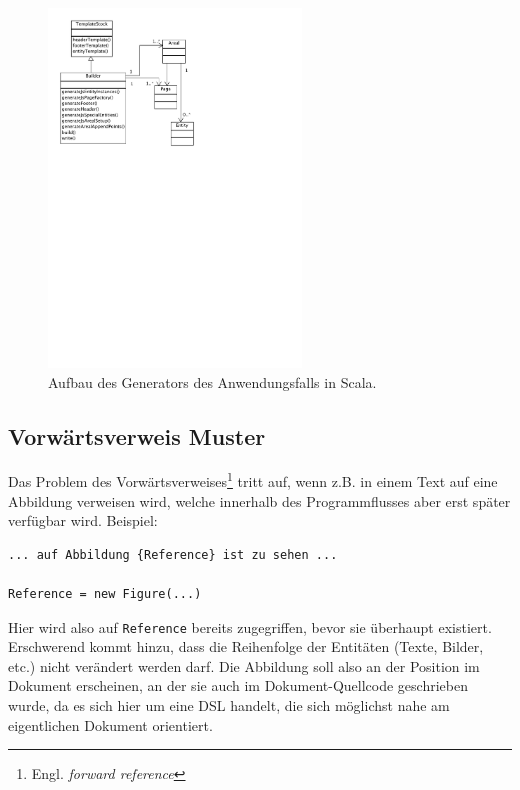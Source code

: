 \begin{figure}[h!]
  \centering
    \includegraphics[width=0.6\textwidth]{figures/uml_generator.pdf}
  \caption{Aufbau des Generators des Anwendungsfalls in Scala.}\label{fig-uml_generator}
\end{figure}


\subsection{Vorwärtsverweis Muster}\label{sec-forwardreference}

Das Problem des
Vorwärtsverweises\footnote{Engl. \emph{forward reference}} tritt auf,
wenn z.B. in einem Text auf eine Abbildung
verweisen wird, welche innerhalb des Programmflusses aber erst später verfügbar
wird. Beispiel:

\begin{lstlisting}
... auf Abbildung {Reference} ist zu sehen ...

Reference = new Figure(...)
\end{lstlisting}

Hier wird also auf \verb|Reference| bereits zugegriffen,
bevor sie überhaupt existiert. Erschwerend kommt hinzu, dass die
Reihenfolge der Entitäten (Texte, Bilder, etc.) nicht verändert werden darf.
Die Abbildung soll also an der Position im Dokument erscheinen, an der sie
auch im Dokument-Quellcode geschrieben wurde, da es sich hier um eine DSL
handelt, die sich möglichst nahe am eigentlichen Dokument orientiert.

